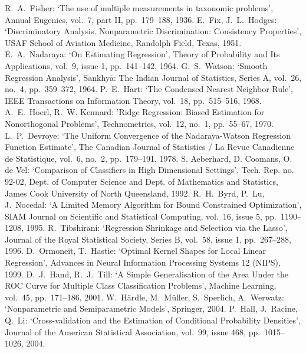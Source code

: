 \cleardoublepage
{}
{}
\begin{thebibliography}{99}
R.\ A.\ Fisher: `The use of multiple measurements in taxonomic problems', Annual Eugenics, vol.\ 7, part II, pp.\ 179--188, 1936.
%
E.\ Fix, J.\ L.\ Hodges: `Discriminatory Analysis. Nonparametric Discrimination: Consistency Properties', USAF School of Aviation Medicine, Randolph Field, Texas, 1951.
%
E.\ A.\ Nadaraya: `On Estimating Regression', Theory of Probability and Its Applications, vol.\ 9, issue 1, pp.\ 141--142, 1964.
%
G.\ S.\ Watson: `Smooth Regression Analysis', Sankhyā: The Indian Journal of Statistics, Series A, vol.\ 26, no.\ 4, pp.\ 359--372, 1964.
%
P.\ E.\ Hart: `The Condensed Nearest Neighbor Rule', IEEE Transactions on Information Theory, vol.\ 18, pp.\ 515–516, 1968.
%
A.\ E.\ Hoerl, R.\ W. Kennard: 'Ridge Regression: Biased Estimation for Nonorthogonal Problems', Technometrics, vol.\ 12, no.\ 1, pp.\ 55--67, 1970.
%
L.\ P.\ Devroye: `The Uniform Convergence of the Nadaraya-Watson Regression Function Estimate', The Canadian Journal of Statistics / La Revue Canadienne de Statistique, vol.\ 6, no.\ 2, pp.\ 179--191, 1978.
%
S. Aeberhard, D. Coomans, O. de Vel: `Comparison of Classifiers in High Dimensional Settings', Tech. Rep. no. 92-02, Dept. of Computer Science and Dept. of Mathematics and Statistics, James Cook University of North Queensland, 1992. 
%
R.\ H.\ Byrd, P.\ Lu, J.\ Nocedal: `A Limited Memory Algorithm for Bound Constrained Optimization', SIAM Journal on Scientific and Statistical Computing, vol.\ 16, issue 5, pp.\ 1190--1208, 1995.
%
R.\ Tibshirani: `Regression Shrinkage and Selection via the Lasso', Journal of the Royal Statistical Society, Series B, vol.\ 58, issue 1, pp.\ 267--288, 1996.
%
D.\ Ormoneit, T.\ Hastie: `Optimal Kernel Shapes for Local Linear Regression', Advances in Neural Information Processing Systems 12 (NIPS), 1999.
%
D.\ J.\ Hand, R.\ J.\ Till: `A Simple Generalisation of the Area Under the ROC Curve for Multiple Class Classification Problems', Machine Learning, vol.\ 45, pp.\ 171--186, 2001.
%
W.\ Härdle, M.\ Müller, S.\ Sperlich, A.\ Werwatz: `Nonparametric and Semiparametric Models', Springer, 2004.
%
P.\ Hall, J.\ Racine, Q.\ Li: `Cross-validation and the Estimation of Conditional Probability Densities', Journal of the American Statistical Association, vol.\ 99, issue 468, pp.\ 1015--1026, 2004.

\end{thebibliography}

